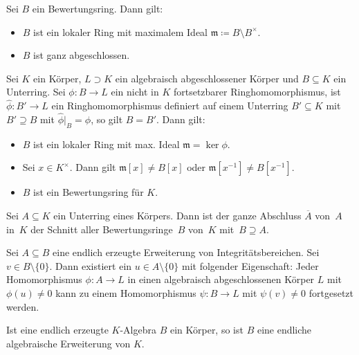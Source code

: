 \documentclass{cheat-sheet}
\newcommand{\mmm}{\mathfrak{m}}
\begin{document}
\begin{prop}
  Sei $B$ ein Bewertungsring.
  Dann gilt:
  \begin{itemize}
    \item $B$ ist ein lokaler Ring mit maximalem Ideal $\mmm \coloneqq B \setminus B^{\times}$.
    \item $B$ ist ganz abgeschlossen.
  \end{itemize}
\end{prop}


\begin{satz}
  Sei $K$ ein Körper, $L \supset K$ ein algebraisch abgeschlossener Körper und $B \subseteq K$ ein Unterring.
  Sei $\phi : B \to L$ ein nicht in $K$ fortsetzbarer Ringhomomorphismus, \dh{} ist $\hat{\phi} : B' \to L$ ein Ringhomomorphismus definiert auf einem Unterring $B' \subseteq K$ mit $B' \supseteq B$ mit $\hat{\phi}|_{B} = \phi$, so gilt $B = B'$.
  Dann gilt:
  \begin{itemize}
    \item $B$ ist ein lokaler Ring mit max. Ideal $\mmm = \ker \phi$.
    \item Sei $x \in K^{\times}$.
    Dann gilt $\mmm[x] \neq B[x]$ oder $\mmm[x^{-1}] \neq B[x^{-1}]$.
    \item $B$ ist ein Bewertungsring für $K$.
  \end{itemize}
\end{satz}

\begin{kor}
  Sei $A \subseteq K$ ein Unterring eines Körpers.
  Dann ist der ganze Abschluss $\overline{A}$ von~$A$ in~$K$ der Schnitt aller Bewertungsringe~$B$ von~$K$ mit~$B \supseteq A$.
\end{kor}

\begin{prop}
  Sei $A \subseteq B$ eine endlich erzeugte Erweiterung von Integritätsbereichen.
  Sei $v \in B \setminus \{ 0 \}$.
  Dann existiert ein $u \in A \setminus \{ 0 \}$ mit folgender Eigenschaft:
  Jeder Homomorphismus $\phi : A \to L$ in einen algebraisch abgeschlossenen Körper $L$ mit $\phi(u) \neq 0$ kann zu einem Homomorphismus $\psi : B \to L$ mit $\psi(v) \neq 0$ fortgesetzt werden.
\end{prop}


\begin{kor}
  Ist eine endlich erzeugte $K$-Algebra $B$ ein Körper, so ist $B$ eine endliche algebraische Erweiterung von $K$.
\end{kor}
\end{document}
